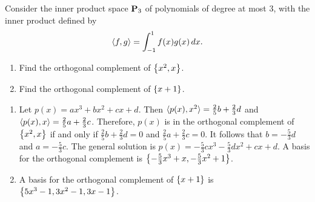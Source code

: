 \begin{ex}
  Consider the inner product space $\mathbf{P}_3$ of polynomials of degree
  at most $3$, with the inner product defined by
  \begin{equation*}
    \langle f,g\rangle = \int_{-1}^{1} f(x)g(x)\,dx.
  \end{equation*}
  \begin{enumerate}
  \item Find the orthogonal complement of $\left\{x^2,x\right\}$.
  \item Find the orthogonal complement of $\left\{x+1\right\}$.
  \end{enumerate}
  \begin{sol}
    \begin{enumerate}
    \item Let $p(x)=ax^3+bx^2+cx+d$. Then
      $\langle p(x), x^2\rangle = \frac{2}{5}b + \frac{2}{3}d$ and
      $\langle p(x), x\rangle = \frac{2}{5}a + \frac{2}{3}c$.  Therefore,
      $p(x)$ is in the orthogonal complement of $\left\{x^2,x\right\}$ if and
      only if $\frac{2}{5}b + \frac{2}{3}d=0$ and
      $\frac{2}{5}a + \frac{2}{3}c=0$. It follows that
      $b=-\frac{5}{3}d$ and $a=-\frac{5}{3}c$. The general solution is
      $p(x) = -\frac{5}{3}cx^3 - \frac{5}{3}dx^2 + cx + d$. A basis
      for the orthogonal complement is
      $\left\{-\frac{5}{3} x^3 + x, -\frac{5}{3} x^2 + 1\right\}$.
    \item A basis for the orthogonal complement of $\left\{x+1\right\}$ is
      $\left\{5x^3-1, 3x^2-1, 3x-1\right\}$.      
    \end{enumerate}
  \end{sol}
\end{ex}

